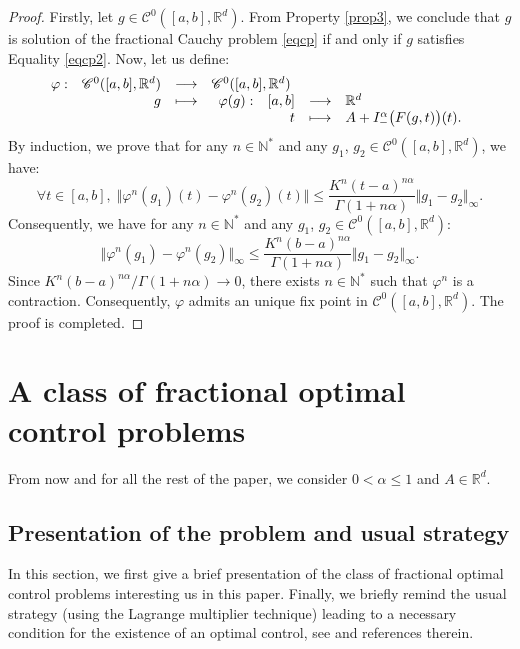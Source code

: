 \documentclass[english,11pt,reqno]{smfart}
\newcommand{\N}{\mathbb{N}}
\newcommand{\R}{\mathbb{R}}
\newcommand{\CC}{\mathscr{C}}
\newcommand{\fonction}[5]{\begin{array}[t]{lrcl}#1 :&#2 &\longrightarrow &#3\\&#4& \longmapsto &#5 \end{array}}
\begin{document}
\begin{proof}
Firstly, let $g \in \CC^0 ([a,b],\R^d)$. From Property \ref{prop3}, we conclude that $g$ is solution of the fractional Cauchy problem \eqref{eqcp} if and only if $g$ satisfies Equality \eqref{eqcp2}. Now, let us define:
\begin{equation}
\fonction{\varphi}{\CC^0 ([a,b],\R^d)}{\CC^0 ([a,b],\R^d)}{g}{\fonction{\varphi (g)}{[a,b]}{\R^d}{t}{A + I^\alpha_- \big( F(g,t) \big) (t).}}
\end{equation}
By induction, we prove that for any $n \in \N^*$ and any $g_1$, $g_2 \in \CC^0 ([a,b],\R^d)$, we have:
\begin{equation}
\forall t \in [a,b], \; \Vert \varphi^n (g_1)(t) - \varphi^n (g_2)(t) \Vert \leq \dfrac{ K^n(t-a)^{n\alpha}}{\Gamma (1+n\alpha) } \Vert g_1 - g_2 \Vert_{\infty}.
\end{equation}
Consequently, we have for any $n \in \N^*$ and any $g_1$, $g_2 \in \CC^0 ([a,b],\R^d)$:
\begin{equation}
\Vert \varphi^n (g_1) - \varphi^n (g_2) \Vert_{\infty} \leq \dfrac{ K^n(b-a)^{n\alpha}}{\Gamma (1+n\alpha) } \Vert g_1 - g_2 \Vert_{\infty}.
\end{equation}
Since $ K^n(b-a)^{n\alpha} / \Gamma (1+n\alpha) \longrightarrow 0$, there exists $n \in \N^*$ such that $\varphi^n$ is a contraction. Consequently, $\varphi$ admits an unique fix point in $\CC^0 ([a,b],\R^d)$. The proof is completed.
\end{proof}


\section{A class of fractional optimal control problems}\label{section2}
From now and for all the rest of the paper, we consider $0 < \alpha \leq 1$ and $A \in \R^d$.

\subsection{Presentation of the problem and usual strategy}\label{section21}
In this section, we first give a brief presentation of the class of fractional optimal control problems interesting us in this paper. Finally, we briefly remind the usual strategy (using the Lagrange multiplier technique) leading to a necessary condition for the existence of an optimal control, see \cite{agra2,agra3,torr,torr2,jeli} and references therein. \\
\end{document}
